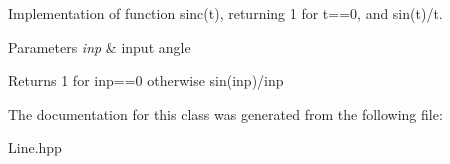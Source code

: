 Implementation of function sinc(t), returning 1 for t==0, and sin(t)/t. 


\begin{DoxyParams}{Parameters}
{\em inp} & input angle \\
\hline
\end{DoxyParams}
\begin{DoxyReturn}{Returns}
1 for inp==0 otherwise sin(inp)/inp 
\end{DoxyReturn}


The documentation for this class was generated from the following file\+:\begin{DoxyCompactItemize}
\item 
Line.\+hpp\end{DoxyCompactItemize}
